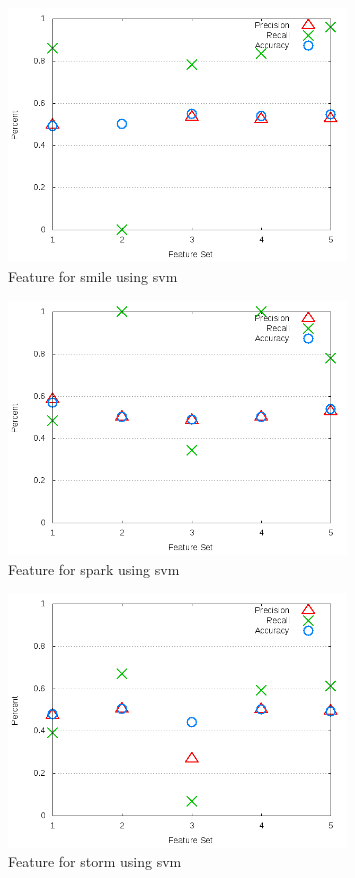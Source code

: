 \begin{figure}[!t]
\centering
\includegraphics[width=0.8\textwidth]{images/svm/test_3/smile_sample_range.png}
\caption{Feature for smile using \gls{svm}}
\label{fig:test_3_smile_svm}
\end{figure}

\begin{figure}[!t]
\centering
\includegraphics[width=0.8\textwidth]{images/svm/test_3/spark_sample_range.png}
\caption{Feature for spark using \gls{svm}}
\label{fig:test_3_spark_svm}
\end{figure}

\begin{figure}[!t]
\centering
\includegraphics[width=0.8\textwidth]{images/svm/test_3/storm_sample_range.png}
\caption{Feature for storm using \gls{svm}}
\label{fig:test_3_storm_svm}
\end{figure}

